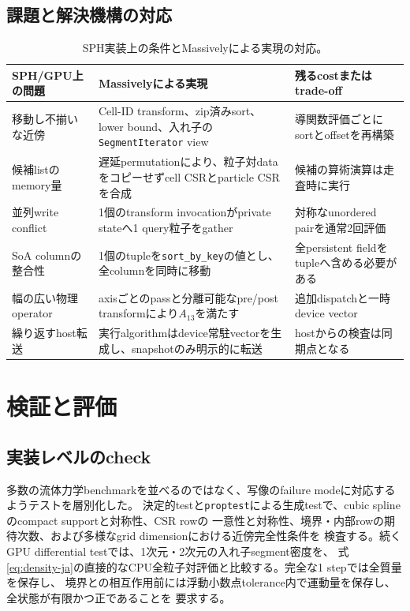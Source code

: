 \documentclass[a4paper,10pt]{ltjsarticle}
\newcommand{\code}[1]{\texttt{#1}}
\begin{document}
\subsection{課題と解決機構の対応}

\begin{table}[ht]
  \centering
  \caption{SPH実装上の条件とMassivelyによる実現の対応。}
  \label{tab:solutions-ja}
  \begin{tabular}{p{}p{}p{}}
    \toprule
    SPH/GPU上の問題 & Massivelyによる実現 & 残るcostまたはtrade-off \\
    \midrule
    移動し不揃いな近傍
      & Cell-ID transform、zip済みsort、lower bound、入れ子の
        \code{SegmentIterator} view
      & 導関数評価ごとにsortとoffsetを再構築 \\
    候補listのmemory量
      & 遅延permutationにより、粒子対dataをコピーせずcell CSRとparticle CSRを合成
      & 候補の算術演算は走査時に実行 \\
    並列write conflict
      & 1個のtransform invocationがprivate stateへ1 query粒子をgather
      & 対称なunordered pairを通常2回評価 \\
    SoA columnの整合性
      & 1個のtupleを\code{sort\_by\_key}の値とし、全columnを同時に移動
      & 全persistent fieldをtupleへ含める必要がある \\
    幅の広い物理operator
      & axisごとのpassと分離可能なpre/post transformにより$A_{13}$を満たす
      & 追加dispatchと一時device vector \\
    繰り返すhost転送
      & 実行algorithmはdevice常駐vectorを生成し、snapshotのみ明示的に転送
      & hostからの検査は同期点となる \\
    \bottomrule
  \end{tabular}
\end{table}

\section{検証と評価}

\subsection{実装レベルのcheck}

多数の流体力学benchmarkを並べるのではなく、写像のfailure modeに対応するようテストを層別化した。
決定的testと\code{proptest}による生成testで、cubic splineのcompact supportと対称性、CSR rowの
一意性と対称性、境界・内部rowの期待次数、および多様なgrid dimensionにおける近傍完全性条件を
検査する。続くGPU differential testでは、1次元・2次元の入れ子segment密度を、
式\eqref{eq:density-ja}の直接的なCPU全粒子対評価と比較する。完全な1 stepでは全質量を保存し、
境界との相互作用前には浮動小数点tolerance内で運動量を保存し、全状態が有限かつ正であることを
要求する。
\end{document}
